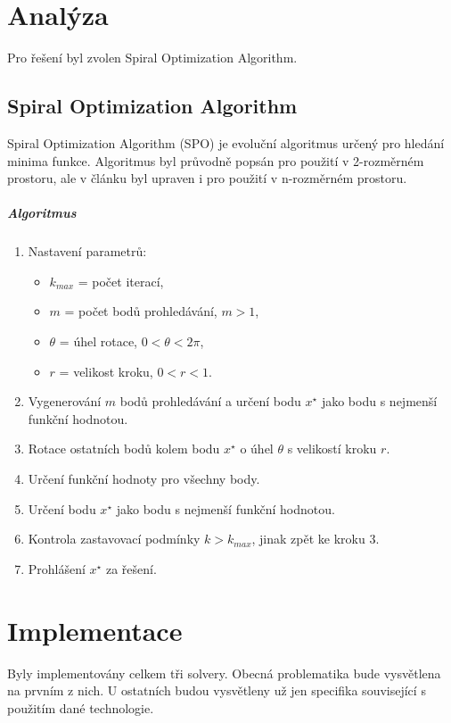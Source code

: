 \documentclass[12pt, a4paper]{report}
\begin{document}
\chapter{Analýza}
Pro řešení byl zvolen Spiral Optimization Algorithm.

\section{Spiral Optimization Algorithm}
Spiral Optimization Algorithm (SPO) je evoluční algoritmus určený pro hledání minima funkce. Algoritmus byl průvodně popsán \cite{spo-2d} pro použití v 2-rozměrném prostoru, ale v článku \cite{spo-nd} byl upraven i pro použití v n-rozměrném prostoru.

\paragraph{Algoritmus}
\begin{enumerate}
	\item Nastavení parametrů:
	\begin{itemize}
		\item $k_{max}$ = počet iterací,
		\item $m$ = počet bodů prohledávání, $m > 1$,
		\item $\theta$ = úhel rotace, $0 < \theta < 2\pi$,
		\item $r$ = velikost kroku, $0 < r < 1$.
	\end{itemize}
	\item Vygenerování $m$ bodů prohledávání a určení bodu $x^{\star}$ jako bodu s nejmenší funkční hodnotou.
	\item Rotace ostatních bodů kolem bodu $x^{\star}$ o úhel $\theta$ s velikostí kroku $r$.
	\item Určení funkční hodnoty pro všechny body.
	\item Určení bodu $x^{\star}$ jako bodu s nejmenší funkční hodnotou.
	\item Kontrola zastavovací podmínky $k > k_{max}$, jinak zpět ke kroku 3.
	\item Prohlášení $x^{\star}$ za řešení.
\end{enumerate}



\chapter{Implementace}
Byly implementovány celkem tři solvery.
Obecná problematika bude vysvětlena na prvním z nich. U ostatních budou vysvětleny už jen specifika související s použitím dané technologie.
\end{document}
